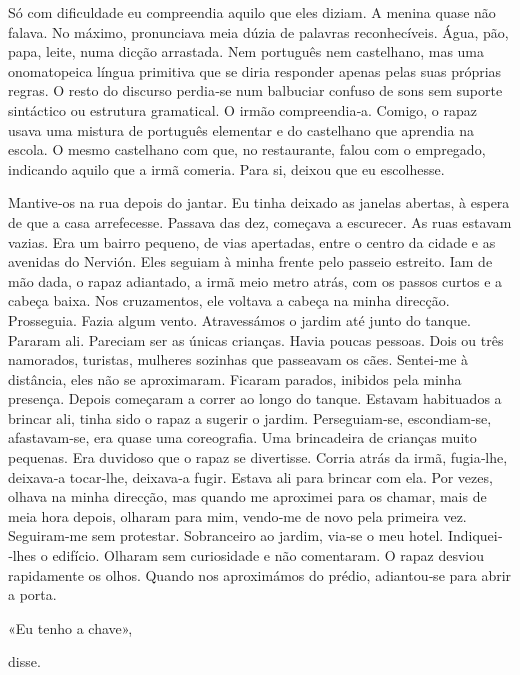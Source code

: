 Só com dificuldade eu compreendia aquilo que eles diziam. A menina quase
não falava. No máximo, pronunciava meia dúzia de palavras reconhecíveis.
Água, pão, papa, leite, numa dicção arrastada. Nem português nem
castelhano, mas uma onomatopeica língua primitiva que se diria responder
apenas pelas suas próprias regras. O resto do discurso perdia­‑se num
balbuciar confuso de sons sem suporte sintáctico ou estrutura
gramatical. O irmão compreendia­‑a. Comigo, o rapaz usava uma mistura de
português elementar e do castelhano que aprendia na escola. O mesmo
castelhano com que, no restaurante, falou com o empregado, indicando
aquilo que a irmã comeria. Para si, deixou que eu escolhesse.

Mantive­‑os na rua depois do jantar. Eu tinha deixado as janelas
abertas, à espera de que a casa arrefecesse. Passava das dez, começava a
escurecer. As ruas estavam vazias. Era um bairro pequeno, de vias
apertadas, entre o centro da cidade e as avenidas do Nervión. Eles
seguiam à minha frente pelo passeio estreito. Iam de mão dada, o rapaz
adiantado, a irmã meio metro atrás, com os passos curtos e a cabeça
baixa. Nos cruzamentos, ele voltava a cabeça na minha direcção.
Prosseguia. Fazia algum vento. Atravessámos o jardim até junto do
tanque. Pararam ali. Pareciam ser as únicas crianças. Havia poucas
pessoas. Dois ou três namorados, turistas, mulheres sozinhas que
passeavam os cães. Sentei­‑me à distância, eles não se aproximaram.
Ficaram parados, inibidos pela minha presença. Depois começaram a correr
ao longo do tanque. Estavam habituados a brincar ali, tinha sido o rapaz
a sugerir o jardim. Perseguiam­‑se, escondiam­‑se, afastavam­‑se, era
quase uma coreografia. Uma brincadeira de crianças muito pequenas. Era
duvidoso que o rapaz se divertisse. Corria atrás da irmã, fugia­‑lhe,
deixava­‑a tocar­‑lhe, deixava­‑a fugir. Estava ali para brincar com
ela. Por vezes, olhava na minha direcção, mas quando me aproximei para
os chamar, mais de meia hora depois, olharam para mim, vendo­‑me de novo
pela primeira vez. Seguiram­‑me sem protestar. Sobranceiro ao jardim,
via­‑se o meu hotel. Indiquei­‑lhes o edifício. Olharam sem curiosidade
e não comentaram. O rapaz desviou rapidamente os olhos. Quando nos
aproximámos do prédio, adiantou­‑se para abrir a porta.

«Eu tenho a chave»,

disse.

